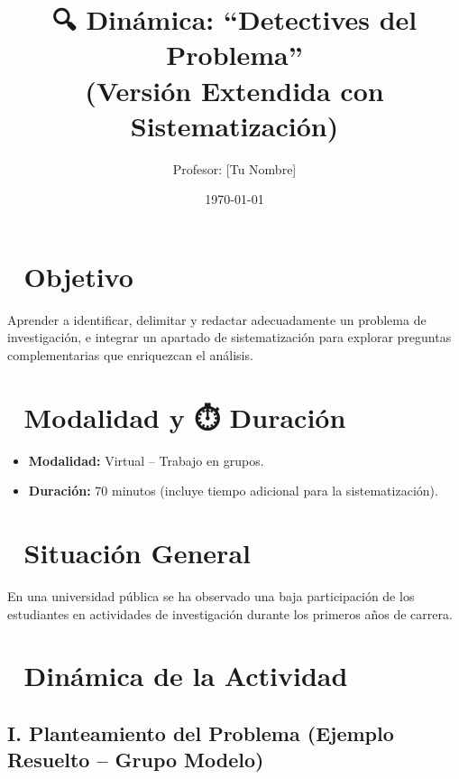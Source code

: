 \documentclass[12pt,a4paper]{article}
\title{🔍 Dinámica: ``Detectives del Problema'' \\ \small{(Versión Extendida con Sistematización)}}
\author{Profesor: [Tu Nombre]}
\date{\today}
\begin{document}
\maketitle

\section*{🎯 Objetivo}
Aprender a identificar, delimitar y redactar adecuadamente un problema de investigación, e integrar un apartado de sistematización para explorar preguntas complementarias que enriquezcan el análisis.

\section*{👥 Modalidad y ⏱️ Duración}
\begin{itemize}[noitemsep]
    \item \textbf{Modalidad:} Virtual – Trabajo en grupos.
    \item \textbf{Duración:} 70 minutos (incluye tiempo adicional para la sistematización).
\end{itemize}

\section*{📌 Situación General}
En una universidad pública se ha observado una baja participación de los estudiantes en actividades de investigación durante los primeros años de carrera.

\section*{🧠 Dinámica de la Actividad}

\subsection*{I. Planteamiento del Problema (Ejemplo Resuelto – Grupo Modelo)}
\end{document}
